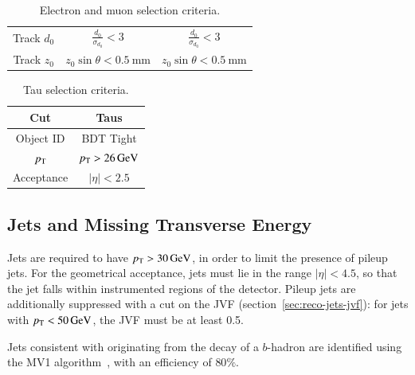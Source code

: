 \begin{table}[h]
\begin{tabular}{ccc}
		Track $d_0$ & $\frac{d_0}{\sigma_{d_0}}<3$  & $\frac{d_0}{\sigma_{d_0}}<3$  \\
		Track $z_0$ & $z_0\sin\theta<0.5~\mbox{mm}$ & $z_0\sin\theta<0.5~\mbox{mm}$  \\
	\end{tabular}
	\caption{Electron and muon selection criteria.}
	\label{table:electron-muon-selections}
\end{table}

\begin{table}[h]
	\centering
		\begin{tabular}{cc}
			Cut & Taus \\
			\hline
			Object ID & BDT Tight \\
			$p_{\text{T}}$ & $p_{\text{T}}>\SI{26}{\giga\electronvolt}$ \\
			Acceptance & $|\eta|<2.5$ \\
		\end{tabular}
	\caption{Tau selection criteria.}
	\label{table:tau-selections}
\end{table}

\subsection{Jets and Missing Transverse Energy}\label{sec:model-independent-jets-met}


Jets are required to have $p_{\text{T}}>\SI{30}{\giga\electronvolt}$, in order to limit the presence of pileup jets. For the geometrical acceptance, jets must lie in the range $|\eta|<4.5$, so that the jet falls within instrumented regions of the detector. Pileup jets are additionally suppressed with a cut on the JVF (section~\ref{sec:reco-jets-jvf}): for jets with $p_{\text{T}}<\SI{50}{\giga\electronvolt}$, the JVF must be at least 0.5. 

Jets consistent with originating from the decay of a $b$-hadron are identified using the MV1 algorithm~\cite{TheATLASCollaboration:2014vj}, with an efficiency of $80\%$. 

